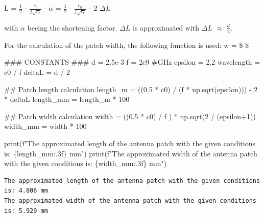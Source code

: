 \documentclass[
  letterpaper,
  DIV=11,
  numbers=noendperiod]{scrartcl}
\newenvironment{Shaded}{\begin{snugshade}}{\end{snugshade}}
\newcommand{\AlertTok}[1]{\textcolor[rgb]{0.68,0.00,0.00}{#1}}
\newcommand{\BuiltInTok}[1]{\textcolor[rgb]{0.00,0.23,0.31}{#1}}
\newcommand{\CommentTok}[1]{\textcolor[rgb]{0.37,0.37,0.37}{#1}}
\newcommand{\DecValTok}[1]{\textcolor[rgb]{0.68,0.00,0.00}{#1}}
\newcommand{\FloatTok}[1]{\textcolor[rgb]{0.68,0.00,0.00}{#1}}
\newcommand{\NormalTok}[1]{\textcolor[rgb]{0.00,0.23,0.31}{#1}}
\newcommand{\OperatorTok}[1]{\textcolor[rgb]{0.37,0.37,0.37}{#1}}
\newcommand{\SpecialCharTok}[1]{\textcolor[rgb]{0.37,0.37,0.37}{#1}}
\newcommand{\SpecialStringTok}[1]{\textcolor[rgb]{0.13,0.47,0.30}{#1}}
\begin{document}
L = \(\frac{1}{2}\) \(\cdot\) \(\frac{c_{0}}{f \sqrt{\epsilon_{r}}}\)
\(\cdot\) \(\alpha\) = \(\frac{1}{2}\) \(\cdot\)
\(\frac{c_{0}}{f\sqrt{\epsilon_{r}}}\) - 2 \(\Delta L\)

with \(\alpha\) beeing the shortening factor. \(\Delta L\) is
approximated with \(\Delta L\) \(\approx\) \(\frac{d}{2}\).

For the calculation of the patch width, the following function is used:
w = \$  \cdot {}
\cdot {}\$

\begin{Shaded}
\begin{Highlighting}[]
\CommentTok{\#\#\# CONSTANTS }\AlertTok{\#\#\#}
\NormalTok{d }\OperatorTok{=} \FloatTok{2.5e{-}3} 
\NormalTok{f }\OperatorTok{=} \FloatTok{2e9} \CommentTok{\#GHz}
\NormalTok{epsilon }\OperatorTok{=} \FloatTok{2.2}
\NormalTok{wavelength }\OperatorTok{=}\NormalTok{ c0 }\OperatorTok{/}\NormalTok{ f}
\NormalTok{deltaL }\OperatorTok{=}\NormalTok{  d }\OperatorTok{/} \DecValTok{2}

\CommentTok{\#\# Patch length calculation}
\NormalTok{length\_m }\OperatorTok{=}\NormalTok{ ((}\FloatTok{0.5} \OperatorTok{*}\NormalTok{ c0) }\OperatorTok{/}\NormalTok{ (f }\OperatorTok{*}\NormalTok{ np.sqrt(epsilon))) }\OperatorTok{{-}} \DecValTok{2} \OperatorTok{*}\NormalTok{ deltaL}
\NormalTok{length\_mm }\OperatorTok{=}\NormalTok{ length\_m }\OperatorTok{*} \DecValTok{100}

\CommentTok{\#\# Patch width calculation}
\NormalTok{width }\OperatorTok{=}\NormalTok{ ((}\FloatTok{0.5} \OperatorTok{*}\NormalTok{ c0) }\OperatorTok{/}\NormalTok{ f ) }\OperatorTok{*}\NormalTok{ np.sqrt(}\DecValTok{2} \OperatorTok{/}\NormalTok{ (epsilon}\OperatorTok{+}\DecValTok{1}\NormalTok{))}
\NormalTok{width\_mm }\OperatorTok{=}\NormalTok{ width }\OperatorTok{*} \DecValTok{100}

\BuiltInTok{print}\NormalTok{(}\SpecialStringTok{f"The approximated length of the antenna patch with the given conditions is: }\SpecialCharTok{\{}\NormalTok{length\_mm}\SpecialCharTok{:.3f\}}\SpecialStringTok{ mm"}\NormalTok{)}
\BuiltInTok{print}\NormalTok{(}\SpecialStringTok{f"The approximated width of the antenna patch with the given conditions is: }\SpecialCharTok{\{}\NormalTok{width\_mm}\SpecialCharTok{:.3f\}}\SpecialStringTok{ mm"}\NormalTok{)}
\end{Highlighting}
\end{Shaded}

\begin{verbatim}
The approximated length of the antenna patch with the given conditions is: 4.806 mm
The approximated width of the antenna patch with the given conditions is: 5.929 mm
\end{verbatim}
\end{document}
